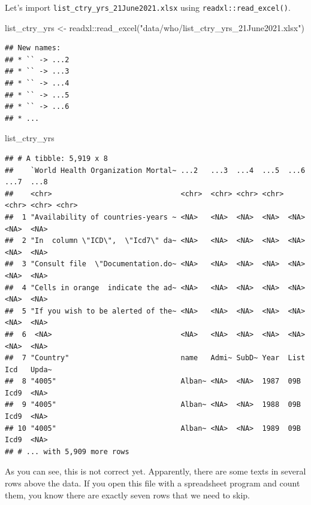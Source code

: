 \documentclass[
]{book}
\newenvironment{Shaded}{\begin{snugshade}}{\end{snugshade}}
\newcommand{\FunctionTok}[1]{\textcolor[rgb]{0.00,0.00,0.00}{#1}}
\newcommand{\NormalTok}[1]{#1}
\newcommand{\OtherTok}[1]{\textcolor[rgb]{0.56,0.35,0.01}{#1}}
\newcommand{\SpecialCharTok}[1]{\textcolor[rgb]{0.00,0.00,0.00}{#1}}
\newcommand{\StringTok}[1]{\textcolor[rgb]{0.31,0.60,0.02}{#1}}
\begin{document}
Let's import \texttt{list\_ctry\_yrs\_21June2021.xlsx} using \texttt{readxl::read\_excel()}.

\begin{Shaded}
\begin{Highlighting}[]
\NormalTok{list\_ctry\_yrs }\OtherTok{\textless{}{-}}\NormalTok{ readxl}\SpecialCharTok{::}\FunctionTok{read\_excel}\NormalTok{(}\StringTok{"data/who/list\_ctry\_yrs\_21June2021.xlsx"}\NormalTok{)}
\end{Highlighting}
\end{Shaded}

\begin{verbatim}
## New names:
## * `` -> ...2
## * `` -> ...3
## * `` -> ...4
## * `` -> ...5
## * `` -> ...6
## * ...
\end{verbatim}

\begin{Shaded}
\begin{Highlighting}[]
\NormalTok{list\_ctry\_yrs}
\end{Highlighting}
\end{Shaded}

\begin{verbatim}
## # A tibble: 5,919 x 8
##    `World Health Organization Mortal~ ...2   ...3  ...4  ...5  ...6  ...7  ...8 
##    <chr>                              <chr>  <chr> <chr> <chr> <chr> <chr> <chr>
##  1 "Availability of countries-years ~ <NA>   <NA>  <NA>  <NA>  <NA>  <NA>  <NA> 
##  2 "In  column \"ICD\",  \"Icd7\" da~ <NA>   <NA>  <NA>  <NA>  <NA>  <NA>  <NA> 
##  3 "Consult file  \"Documentation.do~ <NA>   <NA>  <NA>  <NA>  <NA>  <NA>  <NA> 
##  4 "Cells in orange  indicate the ad~ <NA>   <NA>  <NA>  <NA>  <NA>  <NA>  <NA> 
##  5 "If you wish to be alerted of the~ <NA>   <NA>  <NA>  <NA>  <NA>  <NA>  <NA> 
##  6  <NA>                              <NA>   <NA>  <NA>  <NA>  <NA>  <NA>  <NA> 
##  7 "Country"                          name   Admi~ SubD~ Year  List  Icd   Upda~
##  8 "4005"                             Alban~ <NA>  <NA>  1987  09B   Icd9  <NA> 
##  9 "4005"                             Alban~ <NA>  <NA>  1988  09B   Icd9  <NA> 
## 10 "4005"                             Alban~ <NA>  <NA>  1989  09B   Icd9  <NA> 
## # ... with 5,909 more rows
\end{verbatim}

As you can see, this is not correct yet. Apparently, there are some texts in several rows above the data. If you open this file with a spreadsheet program and count them, you know there are exactly seven rows that we need to skip.
\end{document}
